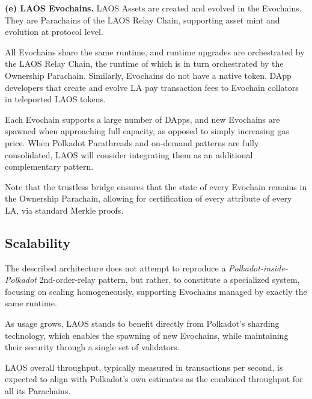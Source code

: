 {\bf (e) LAOS Evochains.}
LAOS Assets are created and evolved in the Evochains.
They are Parachains of the LAOS Relay Chain,
supporting asset mint and evolution at protocol level.

All Evochains share the same runtime, and runtime upgrades are orchestrated by the
LAOS Relay Chain, the runtime of which is in turn orchestrated by the Ownership Parachain.
Similarly, Evochains do not have a native token. DApp developers that create  
and evolve LA pay transaction fees to Evochain collators in teleported LAOS tokens.

Each Evochain supports a large number of DApps, and new Evochains are spawned when approaching full capacity,
as opposed to simply increasing gas price. When Polkadot Parathreads and on-demand patterns
are fully consolidated, LAOS will consider integrating them as an additional complementary pattern. 

Note that the trustless bridge ensures that the state of every Evochain
remains in the Ownership Parachain, allowing for certification of
every attribute of every LA, via standard Merkle proofs.


\subsection{Scalability} \label{sec:architecture-future}

The described architecture does not attempt to reproduce  
a {\it Polkadot-inside-Polkadot} 2nd-order-relay pattern, but rather,
to constitute a specialized system, focusing on scaling homogeneously,
supporting Evochains managed by exactly the same runtime.  

As usage grows, LAOS stands to benefit directly from
Polkadot's sharding technology, which enables the spawning of
new Evochains, while maintaining their security through a single set of validators.

LAOS overall throughput, typically measured in transactions per second,
is expected to align with Polkadot's own estimates as the combined throughput
for all its Parachains. 